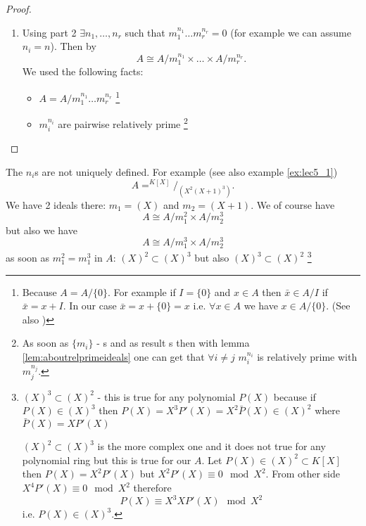 \begin{theorem}
\begin{proof}
\begin{enumerate}
{      }
    \item Using part 2
      $\exists n_1, \dots, n_r$ such that
      $m_1^{n_1} \dots m_r^{n_r} = 0$ (for example we can assume
      $n_i = n$). Then by 
      \[
      A \cong
      A/{m_1^{n_1}} \times \dots \times A/{m_r^{n_r}}.
      \]
      We used the following facts:
      \begin{itemize}
      \item $A = A /m_1^{n_1} \dots m_r^{n_r}$
        \footnote{
          Because $A = A/\{0\}$. For example if $I = \{0\}$ and
          $x \in A$ then $\bar{x} \in A/I$ if $\bar{x} = x + I$. In
          our case $\bar{x} = x + \{0\} = x$ i.e. $\forall x \in A$ we
          have $x \in A/\{0\}$.
          (See also )
        }
      \item $m_i^{n_i}$ are pairwise relatively prime
        \footnote{
          As soon as $\{m_i\}$ - s and as result
          s then with lemma
          \ref{lem:aboutrelprimeideals} one can get that
          $\forall i \ne j$ $m_i^{n_i}$ is relatively prime with
          $m_j^{n_j}$.
        }
      \end{itemize}
    \end{enumerate}
  \end{proof}
  \label{thm:structurefinitekalgebra}
\end{theorem}

\begin{remark}
  The $n_i$s are not uniquely defined. For example (see also example
  \ref{ex:lec5_1}) 
  \[
  A = ^{K\left[X\right]}/_{\left(X^2 \left(X+1\right)^3\right)}.
  \]
  We have 2 ideals there:
  $m_1 = (X)$ and $m_2 = (X+1)$.
  We of course have
  \[
  A \cong A/m_1^2 \times A/m_2^3
  \]
  but also we have
  \[
  A \cong A/m_1^3 \times A/m_2^3
  \]
  as soon as $m_1^2 = m_1^3$ in $A$:
  $(X)^2 \subset (X)^3$ but also
  $(X)^3 \subset (X)^2$
  \footnote{
    $(X)^3 \subset (X)^2$ - this is true for any polynomial
    $P\left(X\right)$ because if
    $P\left(X\right) \in (X)^3$ then
    $P\left(X\right) = X^3 P'\left(X\right) =
    X^2 \bar{P}\left(X\right) \in (X)^2$ where
    $\bar{P}\left(X\right) = X P'\left(X\right)$

    $(X)^2 \subset (X)^3$ is the more complex one and it does not true
    for any polynomial ring but this is true for our $A$.
    Let $P\left(X\right) \in \left(X\right)^2 \subset
    K\left[X\right]$ then
    $P\left(X\right) = X^2 P'\left(X\right)$ but
    $X^2 P'\left(X\right) \equiv 0 \mod X^2$.
    From other side
    $X^4 P'\left(X\right) \equiv 0 \mod X^2$
    therefore
    \[
    P\left(X\right) \equiv X^3 X P'\left(X\right) \mod X^2
    \]
    i.e. $P\left(X\right) \in (X)^3$.
  }
  \label{rem:lec5_4}
\end{remark}

